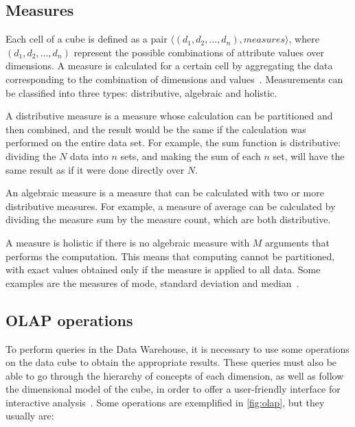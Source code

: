 \subsection{Measures}\label{ch:fun:cube:measures}

Each cell of a cube is defined as a pair $\langle (d_1, d_2, \ldots, d_n), measures \rangle$, where $(d_1, d_2, \ldots, d_n)$ represent the possible combinations of attribute values over dimensions.
A measure is calculated for a certain cell by aggregating the data corresponding to the combination of dimensions and values~\cite{hanDataMiningConcepts2011}.
Measurements can be classified into three types: distributive, algebraic and holistic.

A distributive measure is a measure whose calculation can be partitioned and then combined, and the result would be the same if the calculation was performed on the entire data set.
For example, the sum function is distributive: dividing the $N$ data into $n$ sets, and making the sum of each $n$ set, will have the same result as if it were done directly over $N$.

An algebraic measure is a measure that can be calculated with two or more distributive measures.
For example, a measure of average can be calculated by dividing the measure sum by the measure count, which are both distributive.

A measure is holistic if there is no algebraic measure with $M$ arguments that performs the computation.
This means that computing cannot be partitioned, with exact values obtained only if the measure is applied to all data.
Some examples are the measures of mode, standard deviation and median~\cite{hanDataMiningConcepts2011}.

\subsection{OLAP operations}\label{ch:fun:cube:olapops}

To perform queries in the Data Warehouse, it is necessary to use some operations on the data cube to obtain the appropriate results.
These queries must also be able to go through the hierarchy of concepts of each dimension, as well as follow the dimensional model of the cube, in order to offer a user-friendly interface for interactive analysis~\cite{hanDataMiningConcepts2011}.
Some operations are exemplified in \autoref{fig:olap}, but they usually are:

